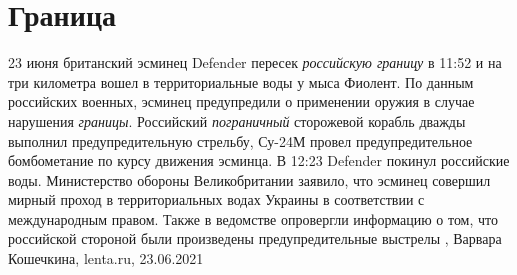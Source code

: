  
 
 
 
 
\chapter{Граница}

23 июня британский эсминец Defender пересек \emph{российскую границу} в 11:52 и на три
километра вошел в территориальные воды у мыса Фиолент. По данным российских
военных, эсминец предупредили о применении оружия в случае нарушения \emph{границы}.
Российский \emph{пограничный} сторожевой корабль дважды выполнил предупредительную
стрельбу, Су-24М провел предупредительное бомбометание по курсу движения
эсминца. В 12:23 Defender покинул российские воды.  Министерство обороны
Великобритании заявило, что эсминец совершил мирный проход в территориальных
водах Украины в соответствии с международным правом. Также в ведомстве
опровергли информацию о том, что российской стороной были произведены
предупредительные выстрелы
, 
Варвара Кошечкина, lenta.ru, 23.06.2021

